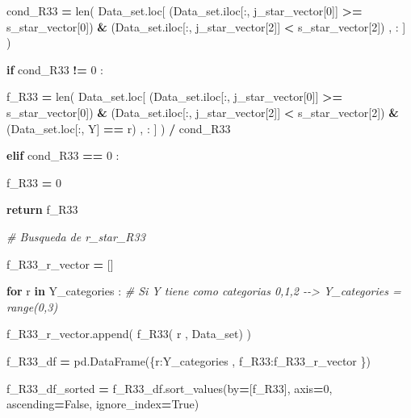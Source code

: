 \documentclass[
  11pt,
  a4paper,
]{article}
\newenvironment{Shaded}{\begin{snugshade}}{\end{snugshade}}
\newcommand{\BuiltInTok}[1]{#1}
\newcommand{\CommentTok}[1]{\textcolor[rgb]{0.56,0.35,0.01}{\textit{#1}}}
\newcommand{\ControlFlowTok}[1]{\textcolor[rgb]{0.13,0.29,0.53}{\textbf{#1}}}
\newcommand{\DecValTok}[1]{\textcolor[rgb]{0.00,0.00,0.81}{#1}}
\newcommand{\KeywordTok}[1]{\textcolor[rgb]{0.13,0.29,0.53}{\textbf{#1}}}
\newcommand{\NormalTok}[1]{#1}
\newcommand{\OperatorTok}[1]{\textcolor[rgb]{0.81,0.36,0.00}{\textbf{#1}}}
\newcommand{\StringTok}[1]{\textcolor[rgb]{0.31,0.60,0.02}{#1}}
\newcommand{\VariableTok}[1]{\textcolor[rgb]{0.00,0.00,0.00}{#1}}
\begin{document}
\begin{Shaded}
\begin{Highlighting}[]
\NormalTok{                        cond\_R33 }\OperatorTok{=} \BuiltInTok{len}\NormalTok{( Data\_set.loc[ (Data\_set.iloc[:, j\_star\_vector[}\DecValTok{0}\NormalTok{]] }\OperatorTok{\textgreater{}=}\NormalTok{ s\_star\_vector[}\DecValTok{0}\NormalTok{]) }\OperatorTok{\&}\NormalTok{ (Data\_set.iloc[:, j\_star\_vector[}\DecValTok{2}\NormalTok{]] }\OperatorTok{\textless{}}\NormalTok{ s\_star\_vector[}\DecValTok{2}\NormalTok{]) , : ] ) }

                        \ControlFlowTok{if}\NormalTok{  cond\_R33 }\OperatorTok{!=} \DecValTok{0}\NormalTok{ :}

\NormalTok{                            f\_R33 }\OperatorTok{=} \BuiltInTok{len}\NormalTok{( Data\_set.loc[ (Data\_set.iloc[:, j\_star\_vector[}\DecValTok{0}\NormalTok{]] }\OperatorTok{\textgreater{}=}\NormalTok{ s\_star\_vector[}\DecValTok{0}\NormalTok{]) }\OperatorTok{\&}\NormalTok{ (Data\_set.iloc[:, j\_star\_vector[}\DecValTok{2}\NormalTok{]] }\OperatorTok{\textless{}}\NormalTok{ s\_star\_vector[}\DecValTok{2}\NormalTok{]) }\OperatorTok{\&}\NormalTok{ (Data\_set.loc[:, }\StringTok{\textquotesingle{}Y\textquotesingle{}}\NormalTok{] }\OperatorTok{==}\NormalTok{ r) , : ] ) }\OperatorTok{/}\NormalTok{ cond\_R33}

                        \ControlFlowTok{elif}\NormalTok{ cond\_R33 }\OperatorTok{==} \DecValTok{0}\NormalTok{ :}

\NormalTok{                            f\_R33 }\OperatorTok{=} \DecValTok{0}

                        \ControlFlowTok{return}\NormalTok{ f\_R33}

                
            \CommentTok{\# Busqueda de r\_star\_R33}

\NormalTok{                f\_R33\_r\_vector }\OperatorTok{=}\NormalTok{ []}

                \ControlFlowTok{for}\NormalTok{ r }\KeywordTok{in}\NormalTok{ Y\_categories :  }\CommentTok{\# Si Y tiene como categorias 0,1,2 {-}{-}\textgreater{} Y\_categories = range(0,3)}

\NormalTok{                    f\_R33\_r\_vector.append( f\_R33( r , Data\_set) )}

\NormalTok{                f\_R33\_df }\OperatorTok{=}\NormalTok{ pd.DataFrame(\{}\StringTok{\textquotesingle{}r\textquotesingle{}}\NormalTok{:Y\_categories  , }\StringTok{\textquotesingle{}f\_R33\textquotesingle{}}\NormalTok{:f\_R33\_r\_vector \})}
        
\NormalTok{                f\_R33\_df\_sorted }\OperatorTok{=}\NormalTok{ f\_R33\_df.sort\_values(by}\OperatorTok{=}\NormalTok{[}\StringTok{\textquotesingle{}f\_R33\textquotesingle{}}\NormalTok{], axis}\OperatorTok{=}\DecValTok{0}\NormalTok{, ascending}\OperatorTok{=}\VariableTok{False}\NormalTok{, ignore\_index}\OperatorTok{=}\VariableTok{True}\NormalTok{)}


\end{Highlighting}
\end{Shaded}
\end{document}
